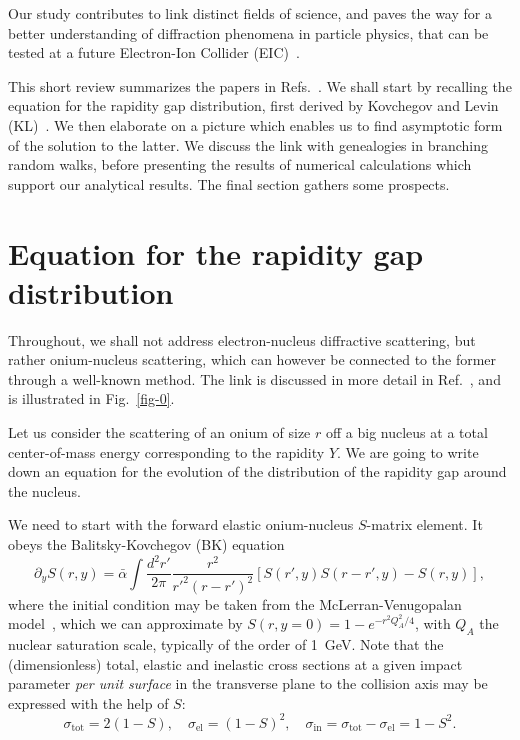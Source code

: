\documentclass{webofc}
\def\be{\begin{equation}}
\def\ee{\end{equation}}
\begin{document}
Our study contributes to link distinct fields of science, and paves the way for a better understanding of diffraction phenomena in particle physics, that can be tested at a future Electron-Ion Collider (EIC)~\cite{Accardi:2012qut}.

This short review summarizes the papers in Refs.~\cite{Mueller:2018zwx,Mueller:2018ned}.
We shall start by recalling the equation for the rapidity gap distribution, first derived by Kovchegov and Levin (KL)~\cite{Kovchegov:1999ji}. We then elaborate on a picture which enables us to find asymptotic form of the solution to the latter. We discuss the link with genealogies in branching random walks, before presenting the results of numerical calculations which support our analytical results. The final section gathers some prospects.





\section{\label{sec-2}Equation for the rapidity gap distribution}

Throughout, we shall not address electron-nucleus diffractive scattering, but rather onium-nucleus scattering, which can however be connected to the former through a well-known method. The link is discussed in more detail in Ref.~\cite{Mueller:2018ned}, and is illustrated in Fig.~\ref{fig-0}.

Let us consider the scattering of an onium of size $r$ off a big nucleus at a total center-of-mass
energy corresponding to the rapidity $Y$.
We are going to write down an equation for the evolution of the distribution of the rapidity
gap around the nucleus.

We need to start with the forward elastic onium-nucleus $S$-matrix element. It obeys the Balitsky-Kovchegov (BK)
equation~\cite{Balitsky:1995ub,Kovchegov:1999ua}
\be
\partial_{y} S(r,y)=\bar\alpha\int\frac{d^2r'}{2\pi}\frac{r^2}{r'^2(r-r')^2}\left[
  S(r',y)S(r-r',y)-S(r,y)
  \right],
\label{eq:bkS}
\ee
where the initial condition may be taken from the McLerran-Venugopalan model~\cite{McLerran:1993ni}, which
we can approximate by
$S(r,y=0)=1-e^{-r^2Q_A^2/4}$,
with $Q_A$ the nuclear saturation scale, typically of the order of 1~GeV.
Note that the (dimensionless) total, elastic and inelastic cross sections at a given impact
parameter {\it per unit surface} in the transverse plane to the collision axis may be
expressed with the help of $S$:
\be
\sigma_\text{tot}=2(1-S),\quad\sigma_\text{el}=(1-S)^2,\quad\sigma_\text{in}=\sigma_\text{tot}-\sigma_\text{el}=1-S^2.
\label{eq:sections}
\ee
\end{document}
